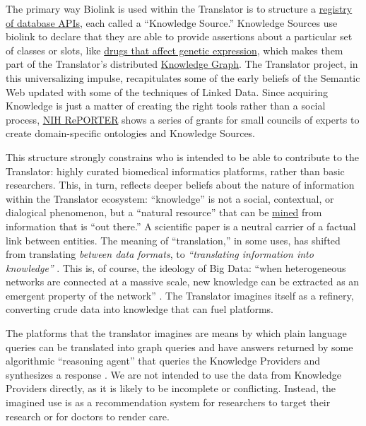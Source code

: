 The primary way Biolink is used within the Translator is to structure a
\href{http://www.smart-api.info/registry}{registry of database APIs},
each called a ``Knowledge Source.'' Knowledge Sources use biolink to
declare that they are able to provide assertions about a particular set
of classes or slots, like
\href{http://www.smart-api.info/ui/adf20dd6ff23dfe18e8e012bde686e31}{drugs
that affect genetic expression}, which makes them part of the
Translator's distributed
\href{http://www.smart-api.info/portal/translator/metakg}{Knowledge
Graph}. The Translator project, in this universalizing impulse,
recapitulates some of the early beliefs of the Semantic Web updated with
some of the techniques of Linked Data. Since acquiring Knowledge is just
a matter of creating the right tools rather than a social process,
\href{https://reporter.nih.gov/search/DShVUhB_ZUq0X5UWFjy5WQ/projects?shared=true}{NIH
RePORTER} shows a series of grants for small councils of experts to
create domain-specific ontologies and Knowledge Sources.

This structure strongly constrains who is intended to be able to
contribute to the Translator: highly curated biomedical informatics
platforms, rather than basic researchers. This, in turn, reflects deeper
beliefs about the nature of information within the Translator ecosystem:
``knowledge'' is not a social, contextual, or dialogical phenomenon, but
a ``natural resource'' that can be
\href{https://reporter.nih.gov/project-details/10548337}{mined} from
information that is ``out there.'' A scientific paper is a neutral
carrier of a factual link between entities. The meaning of
``translation,'' in some uses, has shifted from translating
\emph{between data formats}, to \emph{``translating information into
knowledge''} \cite{consortiumUniversalBiomedicalData2019} . This
is, of course, the ideology of Big Data: ``when heterogeneous networks
are connected at a massive scale, new knowledge can be extracted as an
emergent property of the network'' \cite{morrisScalablePrecisionMedicine2023} . The Translator imagines itself
as a refinery, converting crude data into knowledge that can fuel
platforms.

The platforms that the translator imagines are means by which plain
language queries can be translated into graph queries and have answers
returned by some algorithmic ``reasoning agent'' that queries the
Knowledge Providers and synthesizes a response \cite{renaissancecomputinginstituterenciBiomedicalDataTranslator2022, renaissancecomputinginstituterenciUseCasesShow2022, goelExplanationContainerCaseBased2021, unniBiolinkModelUniversal2022, hailuNIHfundedProjectAims2019} . We are not intended to use the data
from Knowledge Providers directly, as it is likely to be incomplete or
conflicting. Instead, the imagined use is as a recommendation system for
researchers to target their research or for doctors to render care.

